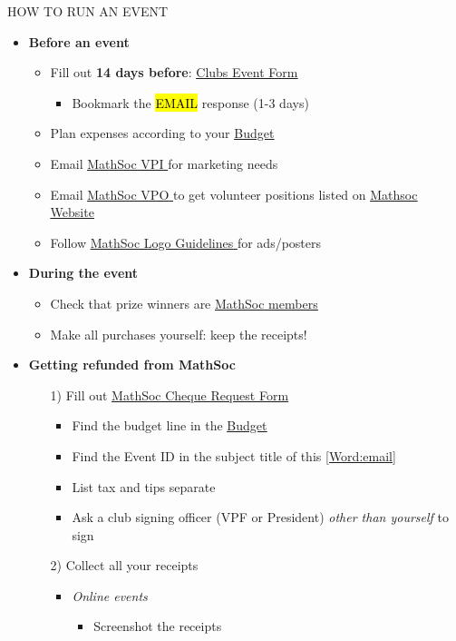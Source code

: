 \documentclass[utf8]{article}
\makeatletter
\newcommand{\budget}{\href{https://drive.google.com/file/d/1uQIh7Qp33NX0TgJhl3DdY-r2HqZzQKuZ/view}{\underline{Budget} }}
\newcommand{\setword}[2]{%
  \phantomsection
  #1\def\@currentlabel{\unexpanded{#1}}\label{#2}%
}
\newcommand{\MathSocVPI}{\href{mailto:vpi@mathsoc.uwaterloo.ca}{\underline{MathSoc VPI} }}
\newcommand{\MathSocVPO}{\href{mailto:vpo@mathsoc.uwaterloo.ca}{\underline{MathSoc VPO} }}
\newcommand{\clubsEventForm}{\href{https://wusa.ca/clubs/clubs-important-forms/clubs-event-form/done?sid=41744&token=1a166c8e45c6113b0322bd3e34fa6fb4}{\underline{Clubs Event Form} }}
\newcommand{\chequeReimbursementForm}{\href{https://mathsoc.uwaterloo.ca/wp-content/uploads/2021/02/Club-Cheque-Request-Form.pdf}{\underline{MathSoc Cheque Request Form} }}
\newcommand{\mathsocsite}{\href{https://mathsoc.uwaterloo.ca/}{\underline{Mathsoc Website} }}
\newcommand{\mathsoclogo}{\href{https://drive.google.com/drive/folders/18v8yaagA74DqMqXaffVm3BGyS8Ze9e5m}{\underline{MathSoc Logo Guidelines} }}
\newcommand{\membership}{\hyperref[sec:membership]{\underline{MathSoc members}}}
\makeatother
\begin{document}
{\Large HOW TO RUN AN EVENT}
\begin{itemize}
    \item \textbf{Before an event}
    \begin{itemize}
        \item Fill out \textbf{14 days before}: \clubsEventForm
        \begin{itemize}
            \item Bookmark the \setword{\hl{EMAIL}}{Word:email} response (1-3 days)
        \end{itemize}
        \item Plan expenses according to your \budget
        \item Email \MathSocVPI for marketing needs
        \item Email \MathSocVPO to get volunteer positions listed on \mathsocsite
        \item Follow \mathsoclogo for ads/posters
    \end{itemize}
    \item \textbf{During the event}
    \begin{itemize}
        \item Check that prize winners are \membership
        \item Make all purchases yourself: keep the receipts!
    \end{itemize}
    \item \textbf{Getting refunded from MathSoc}
    \begin{itemize}
        \item[1)] Fill out \chequeReimbursementForm
        \begin{itemize}
            \item Find the budget line in the \budget 
            \item Find the Event ID in the subject title of this \ref{Word:email}
            \item List tax and tips separate
            \item Ask a club signing officer (VPF or President) \textit{other than yourself} to sign 
        \end{itemize}
        \item[2)] Collect all your receipts
        \begin{itemize}
            \item \textit{Online events}
            \begin{itemize}
                \item Screenshot the receipts

\end{itemize}
\end{itemize}
\end{itemize}
\end{itemize}
\end{document}
